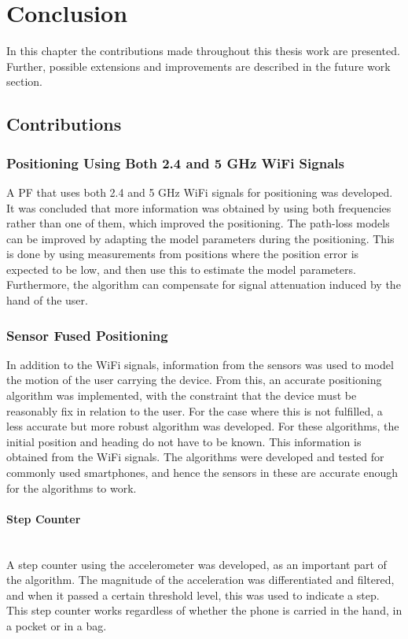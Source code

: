 \documentclass{LTHthesis}
\begin{document}
\chapter{Conclusion}
%
In this chapter the contributions made throughout this thesis work are presented. Further, possible extensions and improvements are described in the future work section.
%
\label{chap:conclusion}

\section{Contributions}

\subsection{Positioning Using Both 2.4 and 5 GHz WiFi Signals}
A PF that uses both 2.4 and 5 GHz WiFi signals for positioning was developed. It was concluded that more information was obtained by using both frequencies rather than one of them, which improved the positioning. The path-loss models can be improved by adapting the model parameters during the positioning. This is done by using measurements from positions where the position error is expected to be low, and then use this to estimate the model parameters. Furthermore, the algorithm can compensate for signal attenuation induced by the hand of the user.

\subsection{Sensor Fused Positioning}
In addition to the WiFi signals, information from the sensors was used to model the motion of the user carrying the device. From this, an accurate positioning algorithm was implemented, with the constraint that the device must be reasonably fix in relation to the user. For the case where this is not fulfilled, a less accurate but more robust algorithm was developed. For these algorithms, the initial position and heading do not have to be known. This information is obtained from the WiFi signals. The algorithms were developed and tested for commonly used smartphones, and hence the sensors in these are accurate enough for the algorithms to work.

\subsubsection{Step Counter} ~\\
A step counter using the accelerometer was developed, as an important part of the algorithm. The magnitude of the acceleration was differentiated and filtered, and when it passed a certain threshold level, this was used to indicate a step. This step counter works regardless of whether the phone is carried in the hand, in a pocket or in a bag. 
\end{document}
